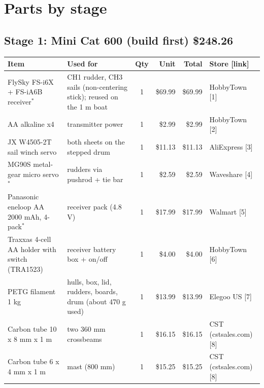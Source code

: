 \documentclass[11pt]{article}
\begin{document}
\section*{Parts by stage}

\subsection*{Stage 1: Mini Cat 600 (build first) \hfill \$248.26}
{\small
\begin{longtable}{L{4.1cm}L{4.5cm}crrl}
\toprule
Item & Used for & Qty & Unit & Total & Store [link] \\
\midrule\endhead
FlySky FS-i6X + FS-iA6B receiver$^\ast$ & CH1 rudder, CH3 sails (non-centering stick); reused on the 1 m boat & 1 & \$69.99 & \$69.99 & HobbyTown [1] \\
AA alkaline x4 & transmitter power & 1 & \$2.99 & \$2.99 & HobbyTown [2] \\
JX W4505-2T sail winch servo & both sheets on the stepped drum & 1 & \$11.13 & \$11.13 & AliExpress [3] \\
MG90S metal-gear micro servo$^\ast$ & rudders via pushrod + tie bar & 1 & \$2.59 & \$2.59 & Waveshare [4] \\
Panasonic eneloop AA 2000 mAh, 4-pack$^\ast$ & receiver pack (4.8 V) & 1 & \$17.99 & \$17.99 & Walmart [5] \\
Traxxas 4-cell AA holder with switch (TRA1523) & receiver battery box + on/off & 1 & \$4.00 & \$4.00 & HobbyTown [6] \\
PETG filament 1 kg & hulls, box, lid, rudders, boards, drum (about 470 g used) & 1 & \$13.99 & \$13.99 & Elegoo US [7] \\
Carbon tube 10 x 8 mm x 1 m & two 360 mm crossbeams & 1 & \$16.15 & \$16.15 & CST (cstsales.com) [8] \\
Carbon tube 6 x 4 mm x 1 m & mast (800 mm) & 1 & \$15.25 & \$15.25 & CST (cstsales.com) [8] \\

\end{longtable}}
\end{document}
